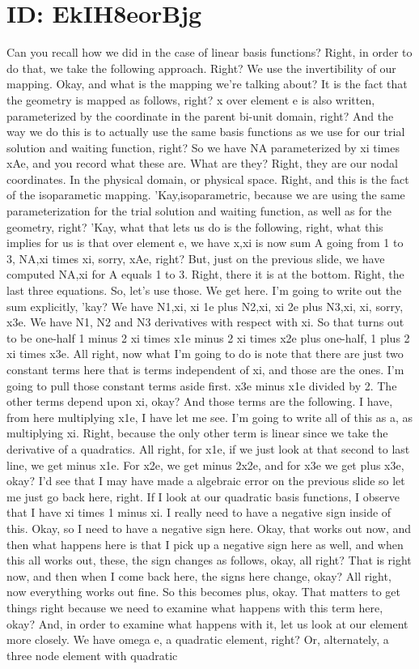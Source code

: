 \documentclass[10pt]{article}
\begin{document}
\section*{ID: EkIH8eorBjg}
Can you recall how we did in the case of linear basis functions? Right, in order to do that, we take the following approach. Right? We use the invertibility of our mapping. Okay, and what is the mapping we're talking about? It is the fact that the geometry is mapped as follows, right? x over element e is also written, parameterized by the coordinate in the parent bi-unit domain, right? And the way we do this is to actually use the same basis functions as we use for our trial solution and waiting function, right? So we have NA parameterized by xi times xAe, and you record what these are. What are they? Right, they are our nodal coordinates. In the physical domain, or physical space. Right, and this is the fact of the isoparametic mapping. 'Kay,isoparametric, because we are using the same parameterization for the trial solution and waiting function, as well as for the geometry, right? 'Kay, what that lets us do is the following, right, what this implies for us is that over element e, we have x,xi is now sum A going from 1 to 3, NA,xi times xi, sorry, xAe, right? But, just on the previous slide, we have computed NA,xi for A equals 1 to 3. Right, there it is at the bottom. Right, the last three equations. So, let's use those. We get here. I’m going to write out the sum explicitly, 'kay? We have N1,xi, xi 1e plus N2,xi, xi 2e plus N3,xi, xi, sorry, x3e. We have N1, N2 and N3 derivatives with respect with xi. So that turns out to be one-half 1 minus 2 xi times x1e minus 2 xi times x2e plus one-half, 1 plus 2 xi times x3e. All right, now what I'm going to do is note that there are just two constant terms here that is terms independent of xi, and those are the ones. I'm going to pull those constant terms aside first. x3e minus x1e divided by 2. The other terms depend upon xi, okay? And those terms are the following. I have, from here multiplying x1e, I have let me see. I'm going to write all of this as a, as multiplying xi. Right, because the only other term is linear since we take the derivative of a quadratics. All right, for x1e, if we just look at that second to last line, we get minus x1e. For x2e, we get minus 2x2e, and for x3e we get plus x3e, okay? I'd see that I may have made a algebraic error on the previous slide so let me just go back here, right. If I look at our quadratic basis functions, I observe that I have xi times 1 minus xi. I really need to have a negative sign inside of this. Okay, so I need to have a negative sign here. Okay, that works out now, and then what happens here is that I pick up a negative sign here as well, and when this all works out, these, the sign changes as follows, okay, all right? That is right now, and then when I come back here, the signs here change, okay? All right, now everything works out fine. So this becomes plus, okay. That matters to get things right because we need to examine what happens with this term here, okay? And, in order to examine what happens with it, let us look at our element more closely. We have omega e, a quadratic element, right? Or, alternately, a three node element with quadratic 
\end{document}
